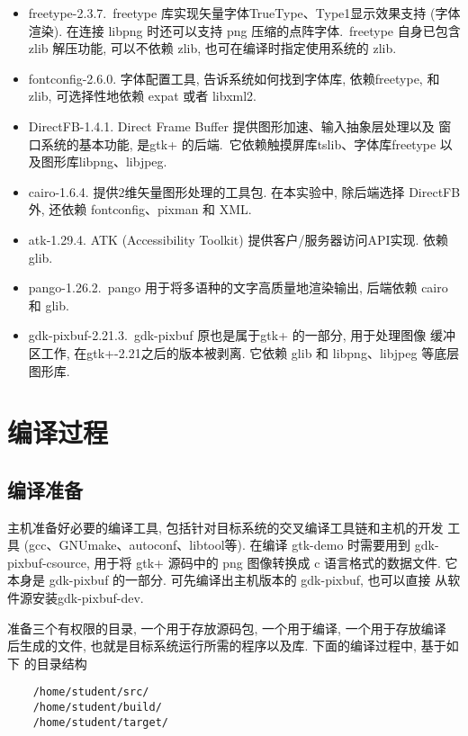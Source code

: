 \begin{itemize}
  \item freetype-2.3.7.\ freetype 库实现矢量字体TrueType、Type1显示效果支持
      (字体渲染). 在连接 libpng 时还可以支持 png 压缩的点阵字体.\ freetype
      自身已包含 zlib 解压功能, 可以不依赖 zlib, 也可在编译时指定使用系统的
      zlib.

  \item fontconfig-2.6.0. 字体配置工具, 告诉系统如何找到字体库, 依赖freetype,
      和 zlib, 可选择性地依赖 expat 或者 libxml2.

  \item DirectFB-1.4.1. Direct Frame Buffer 提供图形加速、输入抽象层处理以及
      窗口系统的基本功能, 是gtk+ 的后端.~它依赖触摸屏库tslib、字体库freetype
      以及图形库libpng、libjpeg.

  \item cairo-1.6.4. 提供2维矢量图形处理的工具包. 在本实验中, 除后端选择
      DirectFB外, 还依赖 fontconfig、pixman 和 XML.\@

  \item atk-1.29.4. ATK (Accessibility Toolkit) 提供客户/服务器访问API实现.
      依赖 glib.

  \item pango-1.26.2.\ pango 用于将多语种的文字高质量地渲染输出, 后端依赖
      cairo 和 glib.

  \item gdk-pixbuf-2.21.3.\ gdk-pixbuf 原也是属于gtk+ 的一部分, 用于处理图像
      缓冲区工作, 在gtk+-2.21之后的版本被剥离. 它依赖 glib 和 libpng、libjpeg
      等底层图形库.
\end{itemize}

\section{编译过程}
\subsection{编译准备}
    主机准备好必要的编译工具, 包括针对目标系统的交叉编译工具链和主机的开发
工具 (gcc、GNUmake、autoconf、libtool等). 在编译 gtk-demo 时需要用到
gdk-pixbuf-csource, 用于将 gtk+ 源码中的 png 图像转换成 c 语言格式的数据文件.
它本身是 gdk-pixbuf 的一部分. 可先编译出主机版本的 gdk-pixbuf, 也可以直接
从软件源安装gdk-pixbuf-dev.

    准备三个有权限的目录, 一个用于存放源码包, 一个用于编译, 一个用于存放编译
后生成的文件, 也就是目标系统运行所需的程序以及库. 下面的编译过程中, 基于如下
的目录结构

\begin{verbatim}
    /home/student/src/
    /home/student/build/
    /home/student/target/
\end{verbatim}

